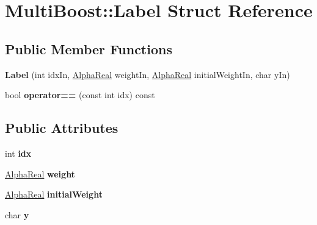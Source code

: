 \hypertarget{structMultiBoost_1_1Label}{\section{Multi\-Boost\-:\-:Label Struct Reference}
\label{structMultiBoost_1_1Label}
}
\subsection*{Public Member Functions}
\begin{DoxyCompactItemize}
\item 
\hypertarget{structMultiBoost_1_1Label_a7ad8bc948da90f12fcd395a34a32ea62}{{\bfseries Label} (int idx\-In, \hyperlink{Defaults_8h_a80184c4fd10ab70a1a17c5f97dcd1563}{Alpha\-Real} weight\-In, \hyperlink{Defaults_8h_a80184c4fd10ab70a1a17c5f97dcd1563}{Alpha\-Real} initial\-Weight\-In, char y\-In)}\label{structMultiBoost_1_1Label_a7ad8bc948da90f12fcd395a34a32ea62}

\item 
\hypertarget{structMultiBoost_1_1Label_a79f7a99332c6736a95e6dc07c948a3ee}{bool {\bfseries operator==} (const int idx) const }\label{structMultiBoost_1_1Label_a79f7a99332c6736a95e6dc07c948a3ee}

\end{DoxyCompactItemize}
\subsection*{Public Attributes}
\begin{DoxyCompactItemize}
\item 
\hypertarget{structMultiBoost_1_1Label_a6a672c3044b66e08b5fcda0fdfb573b8}{int {\bfseries idx}}\label{structMultiBoost_1_1Label_a6a672c3044b66e08b5fcda0fdfb573b8}

\item 
\hypertarget{structMultiBoost_1_1Label_af1ca51e30da1ca1df50fa1fa88fb5361}{\hyperlink{Defaults_8h_a80184c4fd10ab70a1a17c5f97dcd1563}{Alpha\-Real} {\bfseries weight}}\label{structMultiBoost_1_1Label_af1ca51e30da1ca1df50fa1fa88fb5361}

\item 
\hypertarget{structMultiBoost_1_1Label_a9755be02bff3c8c7f8172764fc391265}{\hyperlink{Defaults_8h_a80184c4fd10ab70a1a17c5f97dcd1563}{Alpha\-Real} {\bfseries initial\-Weight}}\label{structMultiBoost_1_1Label_a9755be02bff3c8c7f8172764fc391265}

\item 
\hypertarget{structMultiBoost_1_1Label_ac3b8392c495a1989dce97bd9a883f93b}{char {\bfseries y}}\label{structMultiBoost_1_1Label_ac3b8392c495a1989dce97bd9a883f93b}

\end{DoxyCompactItemize}


